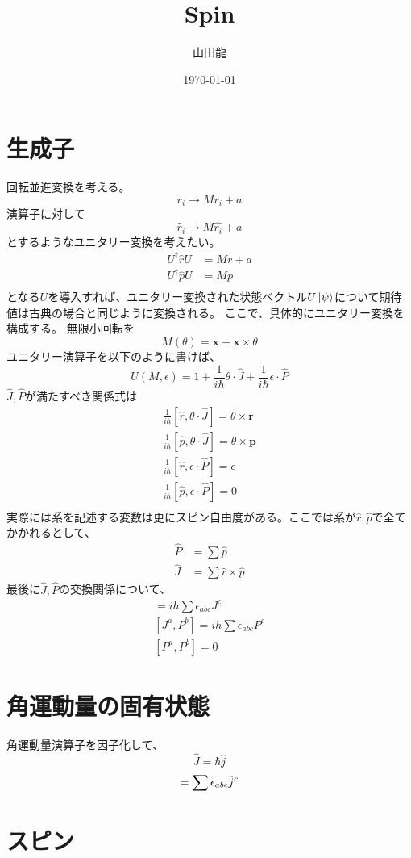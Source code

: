 \documentclass{jsarticle}
\date{\today}
\author{山田龍}
\title{Spin}
\newcommand{\beq}{\begin{equation}}
\newcommand{\eeq}{\end{equation}}
\newcommand{\hr}{\hat{r}}
\newcommand{\hp}{\hat{p}}
\newcommand{\hj}{\hat{j}}
\newcommand{\hcj}{\hat{J}}
\newcommand{\hcp}{\hat{P}}
\newcommand{\rh}{\frac{1}{i\hbar}}
\begin{document}
\maketitle
\section{生成子}
回転並進変換を考える。
\beq
    r_i \rightarrow M r_i + a
\eeq
演算子に対して
\beq
\hat{r}_i \rightarrow M \hat{r_i} + a
\eeq
とするようなユニタリー変換を考えたい。
\begin{align}
    U^\dagger \hr U &= M r + a\\
    U^\dagger \hp U &= Mp\\
\end{align}
となる$U$を導入すれば、ユニタリー変換された状態ベクトル$U\Ket{\psi}$について期待値は古典の場合と同じように変換される。
ここで、具体的にユニタリー変換を構成する。
無限小回転を
\beq
M(\theta) = \bm{x} + \bm{x}  \times \theta
\eeq
ユニタリー演算子を以下のように書けば、
\beq
U(M, \epsilon) = 1 + \rh \theta \cdot \hat{J} + \rh \epsilon \cdot \hat{P}
\eeq
$\hcj ,\hcp$が満たすべき関係式は
\begin{align}
    \rh [\hr ,\theta \cdot \hat{J}] = \theta \times \bm{r}\\
    \rh [\hp ,\theta \cdot \hat{J}] = \theta \times \bm{p}\\
\rh [\hr ,\epsilon \cdot \hcp] = \epsilon\\
\rh [\hp ,\epsilon \cdot \hcp] = 0\\
\end{align}
実際には系を記述する変数は更にスピン自由度がある。ここでは系が$\hr ,\hp$で全てかかれるとして、
\begin{align}
    \hcp &= \sum \hp\\
    \hcj &= \sum \hr \times \hp
\end{align}
最後に$\hcj ,\hcp$の交換関係について、
\begin{align}
    [J^a,J^b] = ih \sum \epsilon_{abc}J^c\\
[J^a,P^b] = ih \sum \epsilon_{abc}P^c\\
[P^a,P^b] = 0
\end{align}
\section{角運動量の固有状態}
角運動量演算子を因子化して、
\beq
    \hcj = \hbar \hj
\eeq
\beq
[\hj^a,\hj^b] = \sum \epsilon_{abc}\hj^c\\
\eeq
\section{スピン}
\end{document}
